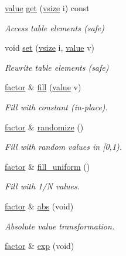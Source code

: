 \begin{DoxyCompactItemize}
\hyperlink{classmerlin_1_1factor_a1b14d19e509403448fbef26b003c9281}{value} \hyperlink{classmerlin_1_1factor_a00577a040e7cc14960d2dccdde51d8fc}{get} (\hyperlink{classmerlin_1_1factor_a31de8d8d0c43cc33dc3874408e75b0fc}{vsize} i) const 
\begin{DoxyCompactList}\small\item\em Access table elements (safe) \end{DoxyCompactList}\item 
void \hyperlink{classmerlin_1_1factor_a4d2cca33f1690c4ae6da5ae619eb85f6}{set} (\hyperlink{classmerlin_1_1factor_a31de8d8d0c43cc33dc3874408e75b0fc}{vsize} i, \hyperlink{classmerlin_1_1factor_a1b14d19e509403448fbef26b003c9281}{value} v)
\begin{DoxyCompactList}\small\item\em Rewrite table elements (safe) \end{DoxyCompactList}\item 
\hyperlink{classmerlin_1_1factor}{factor} \& \hyperlink{classmerlin_1_1factor_afaa0fdcd03f249eb95d0d2d1a0fa4801}{fill} (\hyperlink{classmerlin_1_1factor_a1b14d19e509403448fbef26b003c9281}{value} v)
\begin{DoxyCompactList}\small\item\em Fill with constant (in-\/place). \end{DoxyCompactList}\item 
\hyperlink{classmerlin_1_1factor}{factor} \& \hyperlink{classmerlin_1_1factor_ae9a389d41073f212805020536805fd9c}{randomize} ()
\begin{DoxyCompactList}\small\item\em Fill with random values in \mbox{[}0,1). \end{DoxyCompactList}\item 
\hyperlink{classmerlin_1_1factor}{factor} \& \hyperlink{classmerlin_1_1factor_aad8b981d1b94cd12e289292fa5a7b545}{fill\+\_\+uniform} ()
\begin{DoxyCompactList}\small\item\em Fill with 1/N values. \end{DoxyCompactList}\item 
\hyperlink{classmerlin_1_1factor}{factor} \& \hyperlink{classmerlin_1_1factor_a7f17cb3f6c27f2cb5a74f8469ba4304e}{abs} (void)
\begin{DoxyCompactList}\small\item\em Absolute value transformation. \end{DoxyCompactList}\item 
\hyperlink{classmerlin_1_1factor}{factor} \& \hyperlink{classmerlin_1_1factor_accb7e85361551760b87156becbd5b9d1}{exp} (void)

\end{DoxyCompactItemize}
